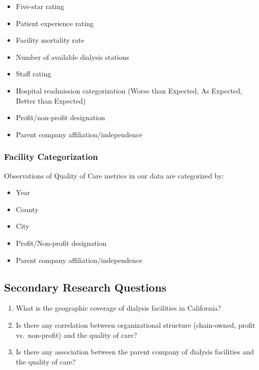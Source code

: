 \documentclass[
  11pt,
  letterpaper,
  DIV=11,
  numbers=noendperiod]{scrartcl}
\providecommand{\tightlist}{%
  \setlength{\itemsep}{0pt}\setlength{\parskip}{0pt}}\usepackage{longtable,booktabs,array}
\begin{document}
\begin{itemize}
\tightlist
\item
  Five-star rating
\item
  Patient experience rating
\item
  Facility mortality rate
\item
  Number of available dialysis stations
\item
  Staff rating
\item
  Hospital readmission categorization (Worse than Expected, As Expected,
  Better than Expected)
\item
  Profit/non-profit designation
\item
  Parent company affiliation/independence
\end{itemize}

\subsubsection{Facility Categorization}\label{facility-categorization}

Observations of Quality of Care metrics in our data are categorized by:

\begin{itemize}
\tightlist
\item
  Year
\item
  County
\item
  City
\item
  Profit/Non-profit designation
\item
  Parent company affiliation/independence
\end{itemize}

\subsection{Secondary Research
Questions}\label{secondary-research-questions}

\begin{enumerate}
\def\labelenumi{\arabic{enumi}.}
\tightlist
\item
  What is the geographic coverage of dialysis facilities in California?
\item
  Is there any correlation between organizational structure
  (chain-owned, profit vs.~non-profit) and the quality of care?
\item
  Is there any association between the parent company of dialysis
  facilities and the quality of care?
\end{enumerate}
\end{document}
